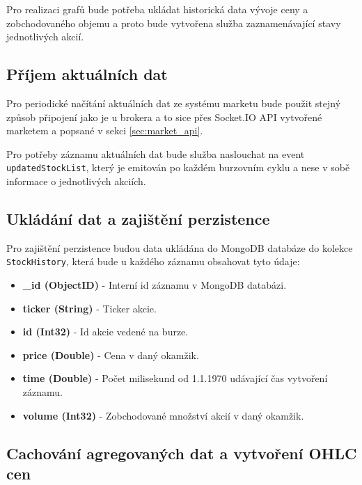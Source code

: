 \documentclass[thesis=M,czech]{FITthesis}[2012/06/26]
\begin{document}
	Pro realizaci grafů bude potřeba ukládat historická data vývoje ceny a zobchodovaného objemu a proto bude vytvořena služba zaznamenávající stavy jednotlivých akcií.
	
\subsection{Příjem aktuálních dat}
	
	Pro periodické načítání aktuálních dat ze systému marketu bude použit stejný způsob připojení jako je u brokera a to sice přes Socket.IO API vytvořené marketem a popsané v sekci \ref{sec:market_api}. 
		
	Pro potřeby záznamu aktuálních dat bude služba naslouchat na event \texttt{updatedStockList}, který je emitován po každém burzovním cyklu a nese v sobě informace o jednotlivých akciích.
	
\subsection{Ukládání dat a zajištění perzistence}
	
	Pro zajištění perzistence budou data ukládána do MongoDB databáze do kolekce \texttt{StockHistory}, která bude u každého záznamu obsahovat tyto údaje:
	
\begin{itemize}

\item \textbf{\_id (ObjectID)} - Interní id záznamu v MongoDB databázi.

\item \textbf{ticker (String)} - Ticker akcie.

\item \textbf{id (Int32)} - Id akcie vedené na burze.

\item \textbf{price (Double)} - Cena v daný okamžik.

\item \textbf{time (Double)} - Počet milisekund od 1.1.1970 udávající čas vytvoření záznamu.

\item \textbf{volume (Int32)} - Zobchodované množství akcií v daný okamžik.

\end{itemize}


\subsection{Cachování agregovaných dat a vytvoření OHLC cen}
\end{document}
